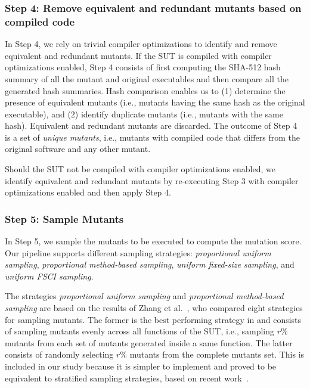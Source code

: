 \subsubsection{Step 4: Remove equivalent and redundant mutants based on compiled code}

In Step 4, we rely on trivial compiler optimizations to identify and remove equivalent and redundant mutants. If the SUT is compiled with compiler optimizations enabled, Step 4 consists of first computing the SHA-512 hash summary of all the mutant and original executables and then compare all the generated hash summaries. Hash comparison enables us to (1) determine the presence of equivalent mutants (i.e., mutants having the same hash as the original executable), and (2) identify duplicate mutants (i.e., mutants with the same hash). %
Equivalent and redundant mutants are discarded.
The outcome of Step 4 is a set of \emph{unique mutants}, i.e., mutants with compiled code that differs from the original software and any other mutant.

Should the SUT not be compiled with compiler optimizations enabled, we identify equivalent and redundant mutants by re-executing Step 3 with compiler optimizations enabled and then apply Step 4.

\subsubsection{Step 5: Sample Mutants}
\label{sec:codeDriven:samplingStep}
\STARTCHANGEDNOV

In Step 5, we sample the mutants to be executed to compute the mutation score. 
Our pipeline supports different sampling strategies: \emph{proportional uniform sampling}, \emph{proportional method-based sampling},  \emph{uniform fixed-size sampling}, and \emph{uniform FSCI sampling}. 

The strategies \emph{proportional uniform sampling} and \emph{proportional method-based sampling} are based on the results of Zhang et al.~\cite{zhang2013operator}, who compared eight strategies for sampling mutants. 
The former is the best performing strategy in \cite{zhang2013operator} and consists of sampling mutants evenly across all functions of the SUT, i.e., sampling $r\%$ mutants from each set of mutants generated inside a same function.
 {The latter consists of randomly selecting $r\%$ mutants from the complete mutants set. This is included in our study because it is simpler to implement and proved to be equivalent to stratified sampling strategies, based on recent work~\cite{gopinath2015hard}.}

